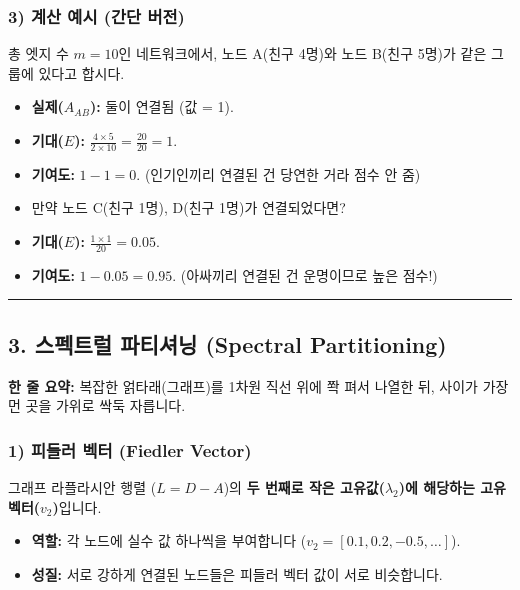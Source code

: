 \documentclass[11pt,a4paper]{book}
\theoremstyle{definition}
\begin{document}
\subsubsection*{3) 계산 예시 (간단 버전)}
총 엣지 수 $m=10$인 네트워크에서, 노드 A(친구 4명)와 노드 B(친구 5명)가 같은 그룹에 있다고 합시다.
\begin{itemize}
    \item \textbf{실제($A_{AB}$):} 둘이 연결됨 (값 = 1).
    \item \textbf{기대($E$):} $\frac{4 \times 5}{2 \times 10} = \frac{20}{20} = 1$.
    \item \textbf{기여도:} $1 - 1 = 0$. (인기인끼리 연결된 건 당연한 거라 점수 안 줌)
    \item 만약 노드 C(친구 1명), D(친구 1명)가 연결되었다면?
    \item \textbf{기대($E$):} $\frac{1 \times 1}{20} = 0.05$.
    \item \textbf{기여도:} $1 - 0.05 = 0.95$. (아싸끼리 연결된 건 운명이므로 높은 점수!)
\end{itemize}

\vspace{0.5cm}\hrule\vspace{0.5cm}

\subsection{3. 스펙트럴 파티셔닝 (Spectral Partitioning)}

\begin{conceptbox}[title={개념 3: 그래프를 수직선 위에 줄 세우기}]
\textbf{한 줄 요약:} 복잡한 얽타래(그래프)를 1차원 직선 위에 쫙 펴서 나열한 뒤, 사이가 가장 먼 곳을 가위로 싹둑 자릅니다.
\end{conceptbox}

\subsubsection*{1) 피들러 벡터 (Fiedler Vector)}
그래프 라플라시안 행렬 ($L = D - A$)의 \textbf{두 번째로 작은 고유값($\lambda_2$)에 해당하는 고유벡터($v_2$)}입니다.
\begin{itemize}
    \item \textbf{역할:} 각 노드에 실수 값 하나씩을 부여합니다 ($v_2 = [0.1, 0.2, -0.5, \dots]$).
    \item \textbf{성질:} 서로 강하게 연결된 노드들은 피들러 벡터 값이 서로 비슷합니다.
\end{itemize}
\end{document}
